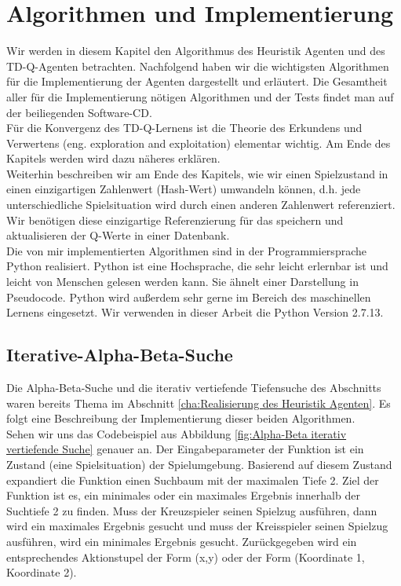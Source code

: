 \chapter{Algorithmen und Implementierung}
\label{cha:Algorithmen und Implementierung}

Wir werden in diesem Kapitel den Algorithmus des Heuristik Agenten und des TD-Q-Agenten betrachten. Nachfolgend haben wir die wichtigsten Algorithmen für die Implementierung der Agenten dargestellt und erläutert. Die Gesamtheit aller für die Implementierung nötigen Algorithmen und der Tests findet man auf der beiliegenden Software-CD. \\

Für die Konvergenz des TD-Q-Lernens ist die Theorie des Erkundens und Verwertens (eng. exploration and exploitation) elementar wichtig. Am Ende des Kapitels werden wird dazu näheres erklären. \\

Weiterhin beschreiben wir am Ende des Kapitels, wie wir einen Spielzustand in einen einzigartigen Zahlenwert (Hash-Wert) umwandeln können, d.h. jede unterschiedliche Spielsituation wird durch einen anderen Zahlenwert referenziert. Wir benötigen diese einzigartige Referenzierung für das speichern und aktualisieren der Q-Werte in einer Datenbank. \\

Die von mir implementierten Algorithmen sind in der Programmiersprache Python realisiert. Python ist eine Hochsprache, die sehr leicht erlernbar ist und leicht von Menschen gelesen werden kann. Sie ähnelt einer Darstellung in Pseudocode. Python wird außerdem sehr gerne im Bereich des maschinellen Lernens eingesetzt. Wir verwenden in dieser Arbeit die Python Version 2.7.13. \\
\newpage

\section{Iterative-Alpha-Beta-Suche}
Die Alpha-Beta-Suche und die iterativ vertiefende Tiefensuche des Abschnitts waren bereits Thema im Abschnitt \ref{cha:Realisierung des Heuristik Agenten}. Es folgt eine Beschreibung der Implementierung dieser beiden Algorithmen.\\

Sehen wir uns das Codebeispiel aus Abbildung \ref{fig:Alpha-Beta iterativ vertiefende Suche} genauer an. Der Eingabeparameter der Funktion ist ein Zustand (eine Spielsituation) der Spielumgebung. Basierend auf diesem Zustand expandiert die Funktion einen Suchbaum mit der maximalen Tiefe 2. Ziel der Funktion ist es, ein minimales oder ein maximales Ergebnis innerhalb der Suchtiefe 2 zu finden. Muss der Kreuzspieler seinen Spielzug ausführen, dann wird ein maximales Ergebnis gesucht und muss der Kreisspieler seinen Spielzug ausführen, wird ein minimales Ergebnis gesucht. Zurückgegeben wird ein entsprechendes Aktionstupel der Form (x,y) oder der Form (Koordinate 1, Koordinate 2). \\

